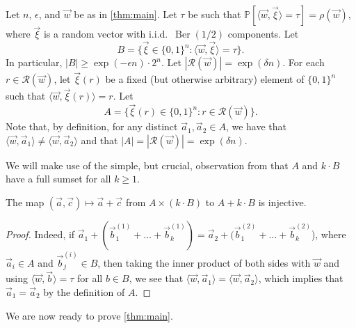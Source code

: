 \documentclass[11pt]{article}
\numberwithin{equation}{section}
\theoremstyle{definition}
\theoremstyle{remark}
\newcommand{\sang}[1]{\langle #1 \rangle}
\newcommand{\mb}{\mathbb}
\newcommand{\mc}{\mathcal}
\newcommand{\on}{\operatorname}
\begin{document}
Let $n$, $\epsilon$, and $\vec{w}$ be as in \cref{thm:main}. Let $\tau$ be such that $\mb{P}[\sang{\vec{w}, \vec{\xi}} = \tau] = \rho(\vec{w})$, where $\vec{\xi}$ is a random vector with i.i.d.\ $\on{Ber}(1/2)$ components. Let 
\[B = \{\vec{\xi} \in \{0,1\}^{n} : \sang{\vec{w}, \vec{\xi}} = \tau\}.\]
In particular, $|B|\ge \exp(-\epsilon n)\cdot 2^{n}$.
Let $|\mc{R}(\vec{w})| = \exp(\delta n)$. For each $r \in \mc{R}(\vec{w})$, let $\vec{\xi}(r)$ be a fixed (but otherwise arbitrary) element of $\{0,1\}^{n}$ such that $\sang{\vec{w},\vec{\xi}(r)} = r$. Let
\[A =\{\vec{\xi}(r) \in \{0,1\}^{n}: r \in \mc{R}(\vec{w})\}.\]
Note that, by definition, for any distinct $\vec{a}_1, \vec{a}_2 \in A$, we have that $\sang{\vec{w}, \vec{a}_1} \neq \sang{\vec{w}, \vec{a}_2}$ and that $|A| = |\mc{R}(\vec{w})| = \exp(\delta n)$.

We will make use of the simple, but crucial, observation from \cite{NPSW20} that $A$ and $k\cdot B$ have a full sumset for all $k\ge 1$. 
\begin{lemma}\label{lem:injective}
The map $(\vec{a},\vec{c})\mapsto\vec{a}+\vec{c}$ from $A\times(k\cdot B)$ to $A + k\cdot B$ is injective.
\end{lemma}
\begin{proof}
Indeed, if $\vec{a}_{1} + (\vec{b}^{(1)}_1 + \dots + \vec{b}^{(1)}_k) = \vec{a}_{2} + (\vec{b}^{(2)}_1 + \dots + \vec{b}^{(2)}_k$), where $\vec{a}_i \in A$ and $\vec{b}^{(i)}_j \in B$, then taking the inner product of both sides with $\vec{w}$ and using $\sang{\vec{w}, \vec{b}} = \tau$ for all $b \in B$, we see that $\sang{\vec{w}, \vec{a}_1} = \sang{\vec{w}, \vec{a}_2}$, which implies that $\vec{a}_1 = \vec{a}_2$ by the definition of $A$. 
\end{proof}

We are now ready to prove \cref{thm:main}.
\end{document}
